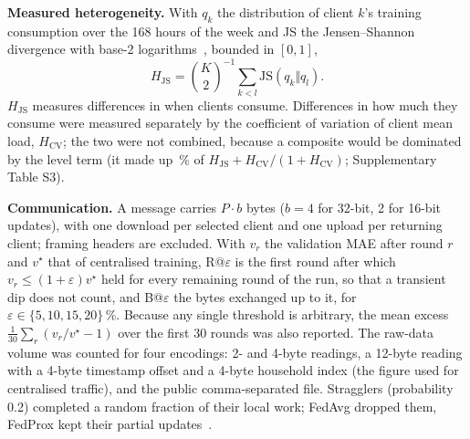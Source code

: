 \textbf{Measured heterogeneity.} With $q_k$ the distribution of client $k$'s training consumption over the 168 hours of
the week and JS the Jensen--Shannon divergence with base-2 logarithms~\cite{lin1991divergence}, bounded in $[0,1]$,
\begin{equation}\label{eq:h}
H_{\mathrm{JS}}={\binom{K}{2}}^{-1}\sum_{k<l}\mathrm{JS}\left(q_k\Vert q_l\right).
\end{equation}
$H_{\mathrm{JS}}$ measures differences in when clients consume. Differences in how much they consume were measured
separately by the coefficient of variation of client mean load, $H_{\mathrm{CV}}$; the two were not combined, because a
composite would be dominated by the level term (it made up \RvHcvShare{}\,\% of $H_{\mathrm{JS}}+H_{\mathrm{CV}}/(1+H_{\mathrm{CV}})$; Supplementary Table S3).

\textbf{Communication.} A message carries $P\cdot b$ bytes ($b=4$ for 32-bit, 2 for 16-bit updates), with one
download per selected client and one upload per returning client; framing headers are excluded. With $v_r$ the
validation MAE after round $r$ and $v^\star$ that of centralised training, R@$\varepsilon$ is the first round after
which $v_r\le(1+\varepsilon)v^\star$ held for every remaining round of the run, so that a transient dip does not
count, and B@$\varepsilon$ the bytes exchanged up to it, for
$\varepsilon\in\{5,10,15,20\}\,\%$. Because any single threshold is arbitrary, the mean excess
$\frac{1}{30}\sum_r(v_r/v^\star-1)$ over the first 30 rounds was also reported. The raw-data volume was counted for
four encodings: 2- and 4-byte readings, a 12-byte reading with a 4-byte timestamp offset and a 4-byte household index
(the figure used for centralised traffic), and the public comma-separated file. Stragglers (probability 0.2) completed
a random fraction of their local work; FedAvg dropped them, FedProx kept their partial updates~\cite{li2020fedprox}.

